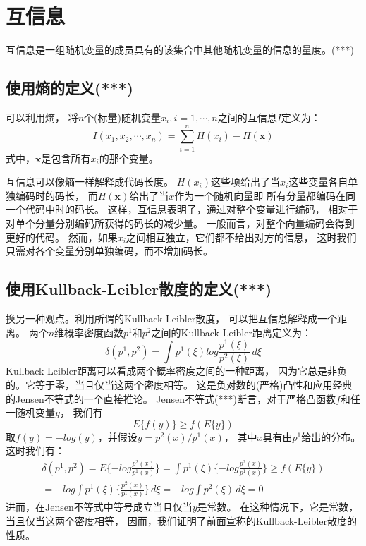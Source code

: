 \section{互信息\cite{AAPO01}}
互信息是一组随机变量的成员具有的该集合中其他随机变量的信息的量度。(***)

\subsection{使用熵的定义(***)}
可以利用熵，
将$n$个(标量)随机变量$x_i, i=1,\cdots,n$之间的互信息$I$定义为：
\begin{equation} \label{mutual_info_defination1}
I(x_1, x_2,\cdots ,x_n)=\sum^n_{i=1} H(x_i)-H(\bm{x})
\end{equation}
式中，$\bm{x}$是包含所有$x_i$的那个变量。

互信息可以像熵一样解释成代码长度。
$H(x_i)$这些项给出了当$x_i$这些变量各自单独编码时的码长，
而$H(\bm{x})$给出了当$x$作为一个随机向量即
所有分量都编码在同一个代码中时的码长。
这样，互信息表明了，通过对整个变量进行编码，
相对于对单个分量分别编码所获得的码长的减少量。
一般而言，对整个向量编码会得到更好的代码。
然而，如果$x_i$之间相互独立，它们都不给出对方的信息，
这时我们只需对各个变量分别单独编码，而不增加码长。

\subsection{使用Kullback-Leibler散度的定义(***)}
换另一种观点。利用所谓的Kullback-Leibler散度，
可以把互信息解释成一个距离。
两个$n$维概率密度函数$p^1$和$p^2$之间的Kullback-Leibler距离定义为：
\begin{equation}
\delta(p^1, p^2) = \int p^1(\xi) log \frac{p^1(\xi)}{p^2(\xi)}\,d\xi
\end{equation}
Kullback-Leibler距离可以看成两个概率密度之间的一种距离，
因为它总是非负的。它等于零，当且仅当这两个密度相等。
这是负对数的(严格)凸性和应用经典的Jensen不等式的一个直接推论。
Jensen不等式(***)断言，对于严格凸函数$f$和任一随机变量$y$，
我们有
\begin{equation}
E\{f(y)\} \ge f(E\{y\})
\end{equation}
取$f(y)=-log(y)$，并假设$y=p^2(x)/p^1(x)$，
其中$x$具有由$p^1$给出的分布。这时我们有：
\begin{multline}
\delta(p^1, p^2) = E\{-log \frac{p^2(x)}{p^1(x)} \} 
	= \int p^1(\xi)\{-log \frac{p^2(x)}{p^1(x)} \} 
    \ge f(E\{y\}) \\ 
    = -log \int p^1(\xi)\{ \frac{p^2(x)}{p^1(x)}\}\,d\xi
    = -log \int p^2(\xi)\,d\xi = 0
\end{multline}
进而，在Jensen不等式中等号成立当且仅当$y$是常数。
在这种情况下，它是常数，当且仅当这两个密度相等，
因而，我们证明了前面宣称的Kullback-Leibler散度的性质。

